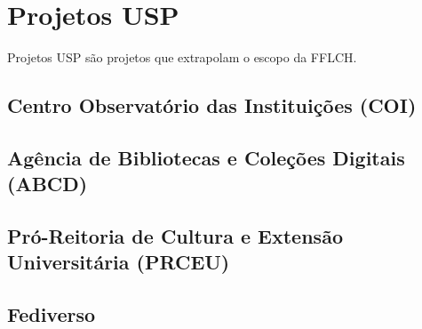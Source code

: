 \chapter{Projetos USP}


Projetos USP são projetos que extrapolam o escopo da FFLCH.

\section{Centro Observatório das Instituições (COI)}

\newpage
\section{Agência de Bibliotecas e Coleções Digitais (ABCD)}

\newpage
\section{Pró-Reitoria de Cultura e Extensão Universitária (PRCEU)}

\newpage
\section{Fediverso}



